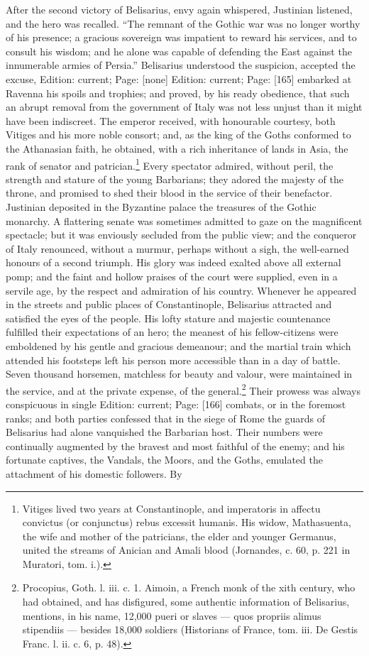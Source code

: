 After the second victory of Belisarius, envy again whispered, Justinian listened, and the hero was recalled. \texthebrew{“}The remnant of the Gothic war was no longer worthy of his presence; a gracious sovereign was impatient to reward his services, and to consult his wisdom; and he alone was capable of defending the East against the innumerable armies of Persia.\texthebrew{}” Belisarius understood the suspicion, accepted the excuse, Edition: current; Page: [none] Edition: current; Page: [165] embarked at Ravenna his spoils and trophies; and proved, by his ready obedience, that such an abrupt removal from the government of Italy was not less unjust than it might have been indiscreet. The emperor received, with honourable courtesy, both Vitiges and his more noble consort; and, as the king of the Goths conformed to the Athanasian faith, he obtained, with a rich inheritance of lands in Asia, the rank of senator and patrician.\footnote{Vitiges lived two years at Constantinople, and imperatoris in affectu convictus (or conjunctus) rebus excessit humanis. His widow, Mathasuenta, the wife and mother of the patricians, the elder and younger Germanus, united the streams of Anician and Amali blood (Jornandes, c. 60, p. 221 in Muratori, tom. i.).} Every spectator admired, without peril, the strength and stature of the young Barbarians; they adored the majesty of the throne, and promised to shed their blood in the service of their benefactor. Justinian deposited in the Byzantine palace the treasures of the Gothic monarchy. A flattering senate was sometimes admitted to gaze on the magnificent spectacle; but it was enviously secluded from the public view; and the conqueror of Italy renounced, without a murmur, perhaps without a sigh, the well-earned honours of a second triumph. His glory was indeed exalted above all external pomp; and the faint and hollow praises of the court were supplied, even in a servile age, by the respect and admiration of his country. Whenever he appeared in the streets and public places of Constantinople, Belisarius attracted and satisfied the eyes of the people. His lofty stature and majestic countenance fulfilled their expectations of an hero; the meanest of his fellow-citizens were emboldened by his gentle and gracious demeanour; and the martial train which attended his footsteps left his person more accessible than in a day of battle. Seven thousand horsemen, matchless for beauty and valour, were maintained in the service, and at the private expense, of the general.\footnote{Procopius, Goth. l. iii. c. 1. Aimoin, a French monk of the xith century, who had obtained, and has disfigured, some authentic information of Belisarius, mentions, in his name, 12,000 pueri or slaves \texthebrew{—} quos propriis alimus stipendiis \texthebrew{—} besides 18,000 soldiers (Historians of France, tom. iii. De Gestis Franc. l. ii. c. 6, p. 48).} Their prowess was always conspicuous in single Edition: current; Page: [166] combats, or in the foremost ranks; and both parties confessed that in the siege of Rome the guards of Belisarius had alone vanquished the Barbarian host. Their numbers were continually augmented by the bravest and most faithful of the enemy; and his fortunate captives, the Vandals, the Moors, and the Goths, emulated the attachment of his domestic followers. By 